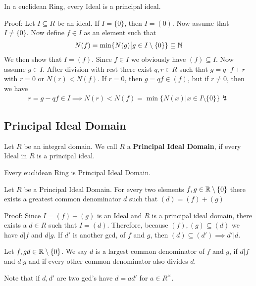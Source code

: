 \begin{theorem}[]
	In a euclidean Ring, every Ideal is a principal ideal.
\end{theorem}
Proof: Let $I \subseteq R$ be an ideal. If $I = \{0\}$, then $I = (0)$. Now assume that $I \neq \{0\}$. Now define $f \in I$ as an element such that
\begin{align*}
	N(f) = \min\{N(g) \big\vert g \in I \setminus \{0\}\} \subseteq \mathbb{N}
\end{align*}
We then show that $I = (f)$. Since $f \in I$ we obviously have $(f) \subseteq I$. Now assume $g \in I$. After division with rest there exist $q,r \in R$ such that $g = q \cdot f + r$ with $r = 0$ or $N(r) < N(f)$. If $r = 0$, then $g = qf \in (f)$, but if $r \neq 0$, then we have
\begin{align*}
	r = g - qf \in I \implies N(r) < N(f) = \min\{N(x) \big\vert x \in I \setminus \{0\}\} \lightning
\end{align*}



\subsection{Principal Ideal Domain}
\begin{definition}
	Let $R$ be an integral domain. We call $R$ a \textbf{Principal Ideal Domain}, if every Ideal in $R$ is a principal ideal.
\end{definition}
Every euclidean Ring is Principal Ideal Domain.


\begin{proposition}[]
	Let $R$ be a Principal Ideal Domain. For every two elements $f,g \in \mathbb{R} \setminus\{0\}$ there exists a greatest common denominator $d$ such that $(d) = (f) + (g)$
\end{proposition}

Proof: Since $I = (f) + (g)$ is an Ideal and $R$ is a principal ideal domain, there exists a $d \in R$ such that $I = (d)$. Therefore, because $(f), (g) \subseteq (d)$ we have $d|f$ and $d|g$. If $d'$ is another gcd, of $f$ and $g$, then $(d) \subseteq (d') \implies d'|d$.

\begin{definition}[gcd]
	Let $f,g d \in \mathbb{R} \setminus \left\{0\right\}$. We say $d$ is a largest common denominator of $f$ and $g$, if $d|f$ and $d|g$ and if every other common denominator also divides $d$.
\end{definition}
Note that if $d,d'$ are two gcd's have $d = ad'$ for $a \in R^{\times}
$.\\


